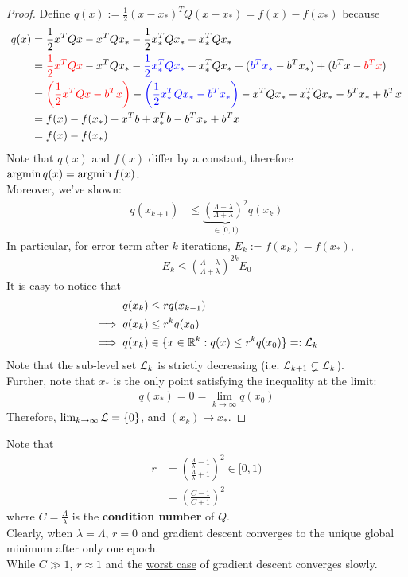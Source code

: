 \documentclass{article}
\begin{document}
	\begin{proof}
		Define $q(x) := \frac{1}{2} (x - x_*)^T Q (x - x _*) = f(x) - f(x_*)$ because
		\begin{align}
			q(x) &= \frac{1}{2} x^T Q x - x^T Q x_* - \frac{1}{2} x_*^T Q x_* + x_*^T Q x_* \\
			&= \textcolor{red}{\frac{1}{2} x^T Q x} - x^T Q x_* - \textcolor{blue}{\frac{1}{2} x_*^T Q x_*} + x_*^T Q x_* + (\textcolor{blue}{b^T x_*} - b^T x_*) + (b^T x - \textcolor{red}{b^T x}) \\
			&= \textcolor{red}{\left(\frac{1}{2} x^T Q x - b^T x\right)}
			- \textcolor{blue}{\left(\frac{1}{2} x_*^T Q x_* - b^T x_*\right)}
			- x^T Q x_* + x^T_* Q x_* - b^T x_* + b^T x \\
			&= f(x) - f(x_*) - x^T b + x_*^T b - b^T x_* + b^T x \\
			&= f(x) - f(x_*)
		\end{align}
		Note that $q(x)$ and $f(x)$ differ by a constant, therefore $\operatorname*{argmin} q(x) = \operatorname*{argmin} f(x)$. \\
		Moreover, we've shown:
		\begin{align}
			q(x_{k+1}) &\leq \underbrace{\left(\frac{\Lambda - \lambda}{\Lambda + \lambda} \right)^2}_{\in [0, 1)} q(x_k)
		\end{align}
		In particular, for error term after $k$ iterations, $E_k := f(x_k) - f(x_*)$,
		\begin{align}
			E_k \leq \left(\frac{\Lambda - \lambda}{\Lambda + \lambda} \right)^{2k} E_0 
		\end{align}
		It is easy to notice that
		\begin{align}
			q(x_k) &\leq r q(x_{k-1}) \\
			\implies q(x_k) &\leq r^k q(x_0) \\
			\implies q(x_k) &\in \{x \in \mathbb{R}^k: q(x) \leq r^k q(x_0)\} =: \mathcal{{L}}_k
		\end{align}
		Note that the sub-level set $\mathcal{{L}}_k$ is strictly decreasing (i.e. $\mathcal{{L}}_{k+1} \subsetneq \mathcal{{L}}_k$). \\
		Further, note that $x_*$ is the only point satisfying the inequality at the limit:
		\begin{align}
			q(x_*) = 0 = \lim_{k \to \infty} q(x_0)
		\end{align}
		Therefore, $\lim_{k \to \infty}\mathcal{{L}} = \{0\}$, and $(x_k) \to x_*$.
	\end{proof}
	
	\begin{remark}
		Note that 
		\begin{align}
			r &= \left(
			\frac{\frac{\Lambda}{\lambda} - 1}{\frac{\Lambda}{\lambda} + 1}
			\right)^2 \in [0, 1) \\
			&= \left(\frac{C - 1}{C + 1}\right)^2
		\end{align}
		where $C = \frac{\Lambda}{\lambda}$ is the \textbf{condition number} of $Q$. \\
		Clearly, when $\lambda = \Lambda$, $r = 0$ and gradient descent converges to the unique global minimum after only one epoch. \\
		While $C \gg 1$, $r \approx 1$ and the \ul{worst case} of gradient descent converges slowly.
	\end{remark}
	
\end{document}
